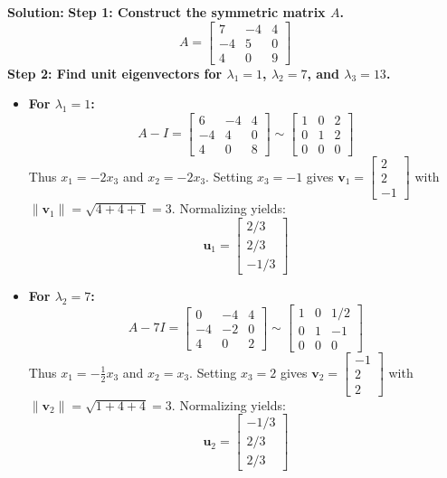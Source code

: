 \documentclass[11pt, letterpaper]{article}
\theoremstyle{definition}
\theoremstyle{remark}
\begin{document}
\textbf{Solution:}
\textbf{Step 1: Construct the symmetric matrix $A$.}
\[
A = \begin{bmatrix} 7 & -4 & 4 \\ -4 & 5 & 0 \\ 4 & 0 & 9 \end{bmatrix}
\]
\textbf{Step 2: Find unit eigenvectors for $\lambda_1 = 1$, $\lambda_2 = 7$, and $\lambda_3 = 13$.}
\begin{itemize}
    \item \textbf{For $\lambda_1 = 1$:}
    \[
    A - I = \begin{bmatrix} 6 & -4 & 4 \\ -4 & 4 & 0 \\ 4 & 0 & 8 \end{bmatrix} \sim \begin{bmatrix} 1 & 0 & 2 \\ 0 & 1 & 2 \\ 0 & 0 & 0 \end{bmatrix}
    \]
    Thus $x_1 = -2x_3$ and $x_2 = -2x_3$. Setting $x_3 = -1$ gives $\mathbf{v}_1 = \begin{bmatrix} 2 \\ 2 \\ -1 \end{bmatrix}$ with $\|\mathbf{v}_1\| = \sqrt{4 + 4 + 1} = 3$. Normalizing yields:
    \[
    \mathbf{u}_1 = \begin{bmatrix} 2/3 \\ 2/3 \\ -1/3 \end{bmatrix}
    \]
    \item \textbf{For $\lambda_2 = 7$:}
    \[
    A - 7I = \begin{bmatrix} 0 & -4 & 4 \\ -4 & -2 & 0 \\ 4 & 0 & 2 \end{bmatrix} \sim \begin{bmatrix} 1 & 0 & 1/2 \\ 0 & 1 & -1 \\ 0 & 0 & 0 \end{bmatrix}
    \]
    Thus $x_1 = -\frac{1}{2}x_3$ and $x_2 = x_3$. Setting $x_3 = 2$ gives $\mathbf{v}_2 = \begin{bmatrix} -1 \\ 2 \\ 2 \end{bmatrix}$ with $\|\mathbf{v}_2\| = \sqrt{1 + 4 + 4} = 3$. Normalizing yields:
    \[
    \mathbf{u}_2 = \begin{bmatrix} -1/3 \\ 2/3 \\ 2/3 \end{bmatrix}
\]
\end{itemize}
\end{document}
